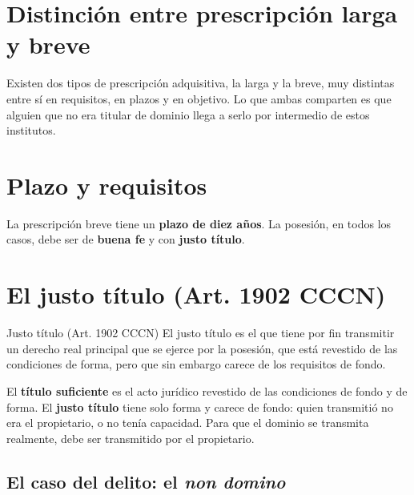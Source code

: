 \documentclass[12pt,oneside]{book}
\begin{document}
\section{Distinción entre prescripción larga y breve}

Existen dos tipos de prescripción adquisitiva, la larga y la breve, muy distintas entre sí en requisitos, en plazos y en objetivo. Lo que ambas comparten es que alguien que no era titular de dominio llega a serlo por intermedio de estos institutos.

\section{Plazo y requisitos}

La prescripción breve tiene un \textbf{plazo de diez años}. La posesión, en todos los casos, debe ser de \textbf{buena fe} y con \textbf{justo título}.


\section{El justo título (Art. 1902 CCCN)}

\begin{definition}{Justo título (Art. 1902 CCCN)}
El justo título es el que tiene por fin transmitir un derecho real principal que se ejerce por la posesión, que está revestido de las condiciones de forma, pero que sin embargo carece de los requisitos de fondo.
\end{definition}

El \textbf{título suficiente} es el acto jurídico revestido de las condiciones de fondo y de forma. El \textbf{justo título} tiene solo forma y carece de fondo: quien transmitió no era el propietario, o no tenía capacidad. Para que el dominio se transmita realmente, debe ser transmitido por el propietario.

\subsection{El caso del delito: el \textit{non domino}}
\end{document}
